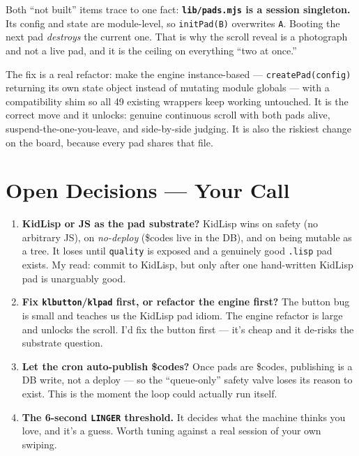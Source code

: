 \documentclass[10pt,letterpaper,twocolumn]{article}
\begin{document}
Both ``not built'' items trace to one fact: \textbf{\texttt{lib/pads.mjs} is a session singleton.} Its config and state are module-level, so \texttt{initPad(B)} overwrites \texttt{A}. Booting the next pad \emph{destroys} the current one. That is why the scroll reveal is a photograph and not a live pad, and it is the ceiling on everything ``two at once.''

The fix is a real refactor: make the engine instance-based --- \texttt{createPad(config)} returning its own state object instead of mutating module globals --- with a compatibility shim so all 49 existing wrappers keep working untouched. It is the correct move and it unlocks: genuine continuous scroll with both pads alive, suspend-the-one-you-leave, and side-by-side judging. It is also the riskiest change on the board, because every pad shares that file.

\section{Open Decisions --- Your Call}

\begin{enumerate}
  \item \textbf{KidLisp or JS as the pad substrate?} KidLisp wins on safety (no arbitrary JS), on \emph{no-deploy} (\$codes live in the DB), and on being mutable as a tree. It loses until \texttt{quality} is exposed and a genuinely good \texttt{.lisp} pad exists. My read: commit to KidLisp, but only after one hand-written KidLisp pad is unarguably good.
  \item \textbf{Fix \texttt{klbutton}/\texttt{klpad} first, or refactor the engine first?} The button bug is small and teaches us the KidLisp pad idiom. The engine refactor is large and unlocks the scroll. I'd fix the button first --- it's cheap and it de-risks the substrate question.
  \item \textbf{Let the cron auto-publish \$codes?} Once pads are \$codes, publishing is a DB write, not a deploy --- so the ``queue-only'' safety valve loses its reason to exist. This is the moment the loop could actually run itself.
  \item \textbf{The 6-second \texttt{LINGER} threshold.} It decides what the machine thinks you love, and it's a guess. Worth tuning against a real session of your own swiping.
\end{enumerate}

\end{document}
